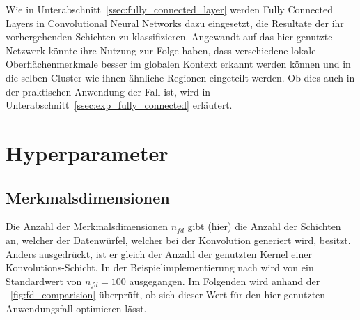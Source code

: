 Wie in Unterabschnitt~\ref{ssec:fully_connected_layer} werden Fully Connected Layers in Convolutional Neural Networks dazu eingesetzt, die Resultate der ihr vorhergehenden Schichten zu klassifizieren. Angewandt auf das hier genutzte Netzwerk könnte ihre Nutzung zur Folge haben, dass verschiedene lokale Oberflächenmerkmale besser im globalen Kontext erkannt werden können und \ggf in die selben Cluster wie ihnen ähnliche Regionen eingeteilt werden. Ob dies auch in der praktischen Anwendung der Fall ist, wird in Unterabschnitt~\ref{ssec:exp_fully_connected} erläutert.


\iffalse

\section{Hyperparameter}
\label{sec:hyperparameter}


\subsection{Merkmalsdimensionen}

Die Anzahl der Merkmalsdimensionen $n_{fd}$ gibt (hier) die Anzahl der Schichten an, welcher der Datenwürfel, welcher bei der Konvolution generiert wird, besitzt. Anders ausgedrückt, ist er gleich der Anzahl der genutzten Kernel einer Konvolutions-Schicht. In der Beispielimplementierung nach \cite{kanezaki_18} wird von ein Standardwert von $n_{fd} = 100$ ausgegangen. Im Folgenden wird anhand der \figurename~\ref{fig:fd_comparision} überprüft, ob sich dieser Wert für den hier genutzten Anwendungsfall optimieren lässt.

